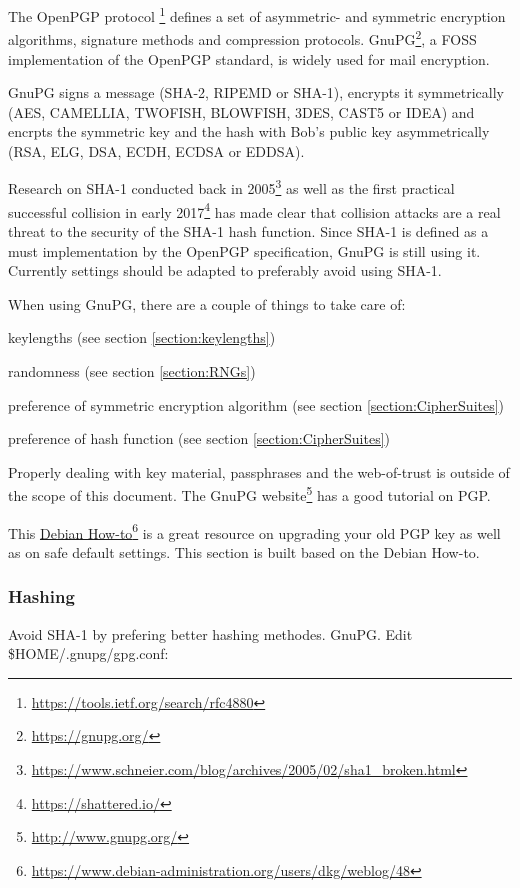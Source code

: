 \gdef\currentsectionname{GPG}
\gdef\currentsubsectionname{GnuPG}

The OpenPGP protocol
\footnote{\url{https://tools.ietf.org/search/rfc4880}}
 defines a set of asymmetric- and symmetric encryption algorithms, signature methods and compression protocols. GnuPG\footnote{\url{https://gnupg.org/}}, a FOSS implementation of the OpenPGP standard, is widely used for mail encryption.
 
GnuPG signs a message (SHA-2, RIPEMD or SHA-1), encrypts it symmetrically (AES, CAMELLIA, TWOFISH, BLOWFISH, 3DES, CAST5 or IDEA) and encrpts the symmetric key and the hash with Bob's public key asymmetrically (RSA, ELG, DSA, ECDH, ECDSA or EDDSA).

Research on SHA-1 conducted back in 2005\footnote{\url{https://www.schneier.com/blog/archives/2005/02/sha1\_broken.html}} as well as the first practical successful collision in early 2017\footnote{\url{https://shattered.io/}} has made clear that collision attacks are a real threat to the security of the SHA-1 hash function. Since SHA-1 is defined as a must implementation by the OpenPGP specification, GnuPG is still using it. Currently settings should be adapted to preferably avoid using SHA-1. 

When using GnuPG, there are a couple of things to take care of:
\begin{itemize*}
  \item keylengths (see section \ref{section:keylengths})
  \item randomness (see section \ref{section:RNGs})
  \item preference of symmetric encryption algorithm (see section \ref{section:CipherSuites})
  \item preference of hash function (see section \ref{section:CipherSuites})
\end{itemize*}

Properly dealing with key material, passphrases and the web-of-trust is outside of the scope of this document. The GnuPG website\footnote{\url{http://www.gnupg.org/}} has a good tutorial on PGP.

This \href{https://www.debian-administration.org/users/dkg/weblog/48}{Debian How-to}\footnote{\url{https://www.debian-administration.org/users/dkg/weblog/48}} is a great resource on upgrading your old PGP key as well as on safe default settings. This section is built based on the Debian How-to.

\subsubsection{Hashing}
Avoid SHA-1 by prefering better hashing methodes. GnuPG. Edit \$HOME/.gnupg/gpg.conf:


